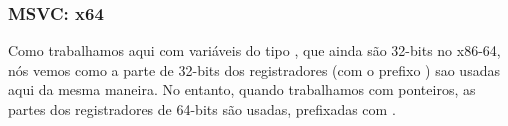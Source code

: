 \subsubsection{MSVC: x64}


Como trabalhamos aqui com variáveis do tipo \Tint, que ainda são 32-bits no x86-64, nós vemos como a parte de 32-bits dos registradores (com o prefixo ) sao usadas aqui da mesma maneira.
No entanto, quando trabalhamos com ponteiros, as partes dos registradores de 64-bits são usadas, prefixadas com .



